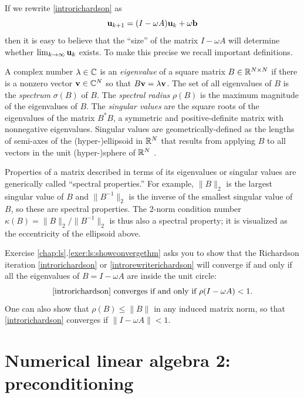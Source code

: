 \medskip
If we rewrite \eqref{introrichardson} as
\begin{equation}
\mathbf{u}_{k+1} = (I - \omega A) \mathbf{u}_k + \omega \mathbf{b}  \label{introrewriterichardson}
\end{equation}
then it is easy to believe that the ``size'' of the matrix $I-\omega A$ will determine whether $\lim_{k\to\infty} \mathbf{u}_k$ exists.  To make this precise we recall important definitions.

A complex number $\lambda \in \mathbb{C}$ is an \emph{eigenvalue} of a square matrix $B\in\mathbb{R}^{N\times N}$ if there is a nonzero vector $\mathbf{v}\in\mathbb{C}^N$ so that $B \mathbf{v} = \lambda \mathbf{v}$.  The set of all eigenvalues of $B$ is the \emph{spectrum} $\sigma(B)$ of $B$.  The \emph{spectral radius} $\rho(B)$ is the maximum magnitude of the eigenvalues of $B$.  The \emph{singular values} are the square roots of the eigenvalues of the matrix $B^*B$, a symmetric and positive-definite matrix with nonnegative eigenvalues.  Singular values are geometrically-defined as the lengths of semi-axes of the (hyper-)ellipsoid in $\mathbb{R}^N$ that results from applying $B$ to all vectors in the unit (hyper-)sphere of $\mathbb{R}^N$ \citep{TrefethenBau1997}.

Properties of a matrix described in terms of its eigenvalues or singular values are generically called ``spectral properties.''  For example, $\|B\|_2$ is the largest singular value of $B$ and $\|B^{-1}\|_2$ is the inverse of the smallest singular value of $B$, so these are spectral properties.  The 2-norm condition number $\kappa(B)=\|B\|_2/\|B^{-1}\|_2$ is thus also a spectral property; it is visualized as the eccentricity of the ellipsoid above.

Exercise \ref{chap:ls}.\ref{exer:ls:showconvergethm} asks you to show that the Richardson iteration \eqref{introrichardson} or \eqref{introrewriterichardson} will converge if and only if all the eigenvalues of $B=I-\omega A$ are inside the unit circle:
\begin{equation}
\text{\eqref{introrichardson} converges if and only if } \rho(I-\omega A) < 1. \label{introconvergethm}
\end{equation}
One can also show that $\rho(B) \le \|B\|$ in any induced matrix norm, so that \eqref{introrichardson} converges if $\|I-\omega A\| < 1$.


\section{Numerical linear algebra 2: preconditioning}

